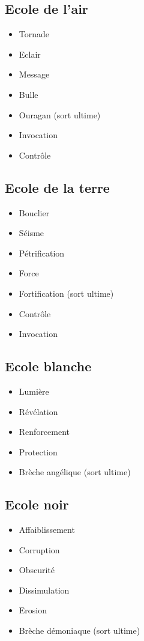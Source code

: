 \subsection{Ecole de l'air}
\begin{itemize}
\item Tornade
\item Eclair
\item Message
\item Bulle
\item Ouragan (sort ultime)
\item Invocation
\item Contrôle
\end{itemize}

\subsection{Ecole de la terre}
\begin{itemize}
\item Bouclier
\item Séisme
\item Pétrification
\item Force
\item Fortification (sort ultime)
\item Contrôle
\item Invocation
\end{itemize}

\subsection{Ecole blanche}
\begin{itemize}
\item Lumière
\item Révélation
\item Renforcement
\item Protection
\item Brèche angélique (sort ultime)
\end{itemize}

\subsection{Ecole noir}
\begin{itemize}
\item Affaiblissement
\item Corruption
\item Obscurité
\item Dissimulation
\item Erosion
\item Brèche démoniaque (sort ultime)
\end{itemize}

